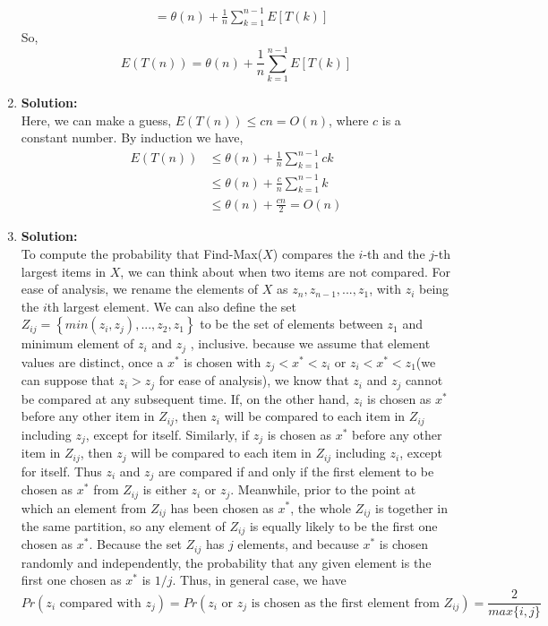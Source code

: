 \begin{enumerate}[label=(\alph*)]
\begin{align*}
		&= \theta(n) + \frac{1}{n}\sum_{k = 1}^{n - 1}E[T(k)]
		\end{align*}
		So,
		$$ E(T(n)) = \theta(n) + \frac{1}{n}\sum_{k = 1}^{n - 1}E[T(k)] $$
	\item 
		\textbf{Solution:} \\
		Here, we can make a guess, $E(T(n)) \leq cn = O(n)$, where $c$ is a constant number. 
		By induction we have,
		\begin{align*}
		E(T(n)) &\leq \theta(n) + \frac{1}{n}\sum_{k = 1}^{n - 1}ck\\
		&\leq \theta(n) + \frac{c}{n}\sum_{k = 1}^{n - 1}k\\
		&\leq \theta(n) + \frac{cn}{2} = O(n)
		\end{align*}

	\item 
		\textbf{Solution:} \\
		 To compute the probability that Find-Max($X$) compares the $i$-th and the $j$-th largest items in $X$, we can think about when two items are not compared. For ease of analysis, we rename the elements of $X$ as $z_n, z_{n - 1}, ..., z_1$, with $z_i$ being the $i$th largest element. We can also define the set $Z_{ij} = \left\{ min(z_i, z_j), ..., z_2, z_1\right\}$ to be the set of elements between $z_1$ and minimum element of $z_i$ and $z_j$ , inclusive. because we assume that element values are distinct, once a $x^{*}$ is chosen with $z_j< x^{*} < z_i$ or $z_i < x^{*} < z_1$(we can suppose that $z_i > z_j$ for ease of analysis), we know that $z_i$ and $z_j$ cannot be compared at any subsequent time. If, on the other hand, $z_i$ is chosen as $x^{*}$ before any other item in $Z_{ij}$, then $z_i$ will be compared to each item in $Z_{ij}$ including $z_j$, except for itself. Similarly, if $z_j$ is chosen as $x^{*}$ before any other item in $Z_{ij}$, then $z_j$ will be compared to each item in $Z_{ij}$ including $z_i$, except for itself. Thus $z_i$ and $z_j$ are compared if and only if the first element to be chosen as $x^{*}$ from $Z_{ij}$ is either $z_i$ or $z_j$. Meanwhile, prior to the point at which an element from $Z_{ij}$ has been chosen as $x^{*}$, the whole $Z_{ij}$ is together in the same partition, so any element of $Z_{ij}$ is equally likely to be the first one chosen as $x^{*}$. Because the set $Z_{ij}$ has $j$ elements, and because $x^{*}$ is chosen randomly and independently, the probability that any given element is the first one chosen as $x^{*}$ is $1/j$. Thus, in general case, we have
		$$ Pr(z_i \text{ compared with } z_j) = Pr(z_i \text{ or } z_j \text{ is chosen as the first element from } Z_{ij}) = \frac{2}{max\{i, j\}}$$
\end{enumerate}